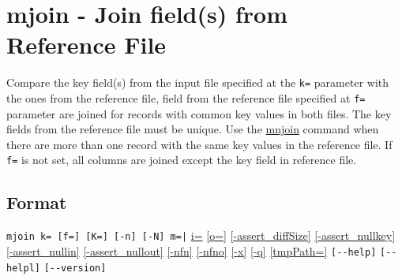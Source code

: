 
%

\section{mjoin - Join field(s) from Reference File\label{sect:mjoin}}
Compare the key field(s) from the input file specified at the \verb|k=| parameter with the ones from the reference file, field from the reference file specified at \verb|f=| parameter are joined for records with common key values in both files. The key fields from the reference file must be unique. Use the \hyperref[sect:mnjoin]{mnjoin} command when there are more than one record with the same key values in the reference file. If \verb|f=| is not set, all columns are joined except the key field in reference file.  


\subsection*{Format}
\verb/mjoin k= [f=] [K=] [-n] [-N] m=|/ 
\hyperref[sect:option_i]{i=}
\hyperref[sect:option_o]{[o=]}
\hyperref[sect:option_assert_diffSize]{[-assert\_diffSize]}
\hyperref[sect:option_assert_nullkey]{[-assert\_nullkey]}
\hyperref[sect:option_assert_nullin]{[-assert\_nullin]}
\hyperref[sect:option_assert_nullout]{[-assert\_nullout]}
\hyperref[sect:option_nfn]{[-nfn]} 
\hyperref[sect:option_nfno]{[-nfno]}  
\hyperref[sect:option_x]{[-x]}
\hyperref[sect:option_q]{[-q]}
\hyperref[sect:option_option_tmppath]{[tmpPath=]}
\verb|[--help]|
\verb|[--helpl]|
\verb|[--version]|\\

